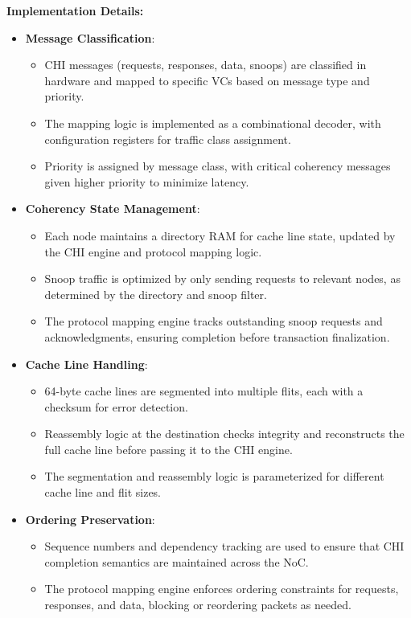 \documentclass[11pt,a4paper]{article}
\begin{document}
\textbf{Implementation Details:}
\begin{itemize}
    \item \textbf{Message Classification}:
    \begin{itemize}
        \item CHI messages (requests, responses, data, snoops) are classified in hardware and mapped to specific VCs based on message type and priority.
        \item The mapping logic is implemented as a combinational decoder, with configuration registers for traffic class assignment.
        \item Priority is assigned by message class, with critical coherency messages given higher priority to minimize latency.
    \end{itemize}
    \item \textbf{Coherency State Management}:
    \begin{itemize}
        \item Each node maintains a directory RAM for cache line state, updated by the CHI engine and protocol mapping logic.
        \item Snoop traffic is optimized by only sending requests to relevant nodes, as determined by the directory and snoop filter.
        \item The protocol mapping engine tracks outstanding snoop requests and acknowledgments, ensuring completion before transaction finalization.
    \end{itemize}
    \item \textbf{Cache Line Handling}:
    \begin{itemize}
        \item 64-byte cache lines are segmented into multiple flits, each with a checksum for error detection.
        \item Reassembly logic at the destination checks integrity and reconstructs the full cache line before passing it to the CHI engine.
        \item The segmentation and reassembly logic is parameterized for different cache line and flit sizes.
    \end{itemize}
    \item \textbf{Ordering Preservation}:
    \begin{itemize}
        \item Sequence numbers and dependency tracking are used to ensure that CHI completion semantics are maintained across the NoC.
        \item The protocol mapping engine enforces ordering constraints for requests, responses, and data, blocking or reordering packets as needed.

\end{itemize}
\end{itemize}
\end{document}
